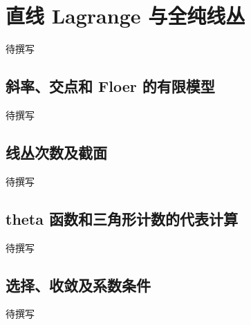 
% 
% 

\section{直线 Lagrange 与全纯线丛}
\label{g4:sec:3302}

待撰写

\subsection{斜率、交点和 Floer 的有限模型}
\label{g4:subsec:3302:01}
待撰写

\subsection{线丛次数及截面}
\label{g4:subsec:3302:02}
待撰写

\subsection{theta 函数和三角形计数的代表计算}
\label{g4:subsec:3302:03}
待撰写

\subsection{选择、收敛及系数条件}
\label{g4:subsec:3302:04}
待撰写
